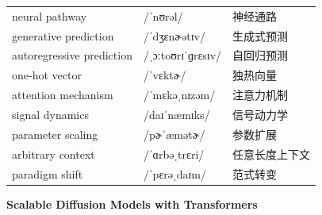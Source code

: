 \documentclass[UTF8,12pt,a4paper]{ctexart}
\providecommand{\zh}[1]{#1}
\begin{document}
\begin{tabular*}{\textwidth}{@{\extracolsep{\fill}}lll@{}}
neural pathway & {\ipafont /ˈnʊrəl/} & \zh{神经通路} \\
generative prediction & {\ipafont /ˈdʒɛnɚətɪv/} & \zh{生成式预测} \\
autoregressive prediction & {\ipafont /ˌɔːtoʊrɪˈɡrɛsɪv/} & \zh{自回归预测} \\
one-hot vector & {\ipafont /ˈvɛktɚ/} & \zh{独热向量} \\
attention mechanism & {\ipafont /ˈmɛkəˌnɪzəm/} & \zh{注意力机制} \\
signal dynamics & {\ipafont /daɪˈnæmɪks/} & \zh{信号动力学} \\
parameter scaling & {\ipafont /pɚˈæmətɚ/} & \zh{参数扩展} \\
arbitrary context & {\ipafont /ˈɑrbəˌtrɛri/} & \zh{任意长度上下文} \\
paradigm shift & {\ipafont /ˈpɛrəˌdaɪm/} & \zh{范式转变} \\
\bottomrule
\end{tabular*}

\newpage

\begin{center}
    {\Large\bfseries Scalable Diffusion Models with Transformers}
\end{center}
\end{document}
